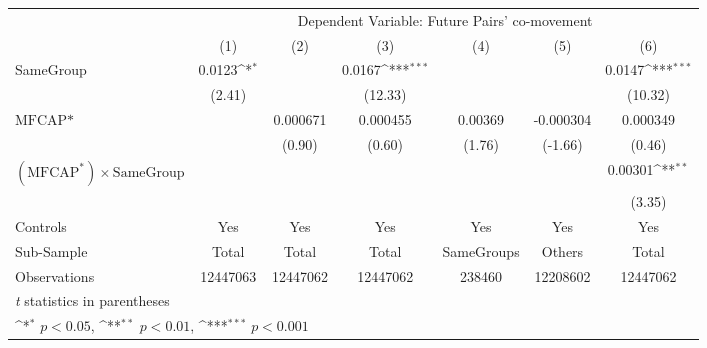 {
\def\sym#1{\ifmmode^{#1}\else\(^{#1}\)\fi}
\begin{tabular}{l*{6}{c}}
\hline\hline
                &\multicolumn{6}{c}{Dependent Variable: Future Pairs' co-movement}                                                \\\cmidrule(lr){2-7}
                &\multicolumn{1}{c}{(1)}         &\multicolumn{1}{c}{(2)}         &\multicolumn{1}{c}{(3)}         &\multicolumn{1}{c}{(4)}         &\multicolumn{1}{c}{(5)}         &\multicolumn{1}{c}{(6)}         \\
\hline
SameGroup       &   0.0123\sym{*}  &                  &   0.0167\sym{***}&                  &                  &   0.0147\sym{***}\\
                &   (2.41)         &                  &  (12.33)         &                  &                  &  (10.32)         \\
[1em]
$ \text{MFCAP*} $&                  & 0.000671         & 0.000455         &  0.00369         &-0.000304         & 0.000349         \\
                &                  &   (0.90)         &   (0.60)         &   (1.76)         &  (-1.66)         &   (0.46)         \\
[1em]
 $ (\text{MFCAP}^*) \times {\text{SameGroup} }  $ &                  &                  &                  &                  &                  &  0.00301\sym{**} \\
                &                  &                  &                  &                  &                  &   (3.35)         \\
\hline
Controls        &      Yes         &      Yes         &      Yes         &      Yes         &      Yes         &      Yes         \\
Sub-Sample      &    Total         &    Total         &    Total         &SameGroups         &   Others         &    Total         \\
Observations    & 12447063         & 12447062         & 12447062         &   238460         & 12208602         & 12447062         \\
\hline\hline
\multicolumn{7}{l}{\footnotesize \textit{t} statistics in parentheses}\\
\multicolumn{7}{l}{\footnotesize \sym{*} \(p<0.05\), \sym{**} \(p<0.01\), \sym{***} \(p<0.001\)}\\
\end{tabular}
}
